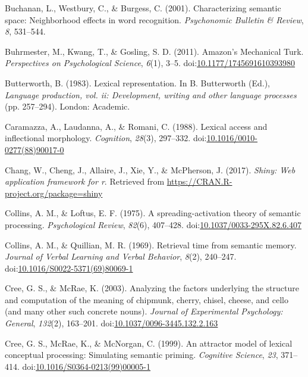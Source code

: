 \documentclass[english,,man]{apa6}
\theoremstyle{definition}
\theoremstyle{definition}
\theoremstyle{definition}
\theoremstyle{remark}
\begin{document}
\hypertarget{ref-Buchanan2001}{}
Buchanan, L., Westbury, C., \& Burgess, C. (2001). Characterizing
semantic space: Neighborhood effects in word recognition.
\emph{Psychonomic Bulletin \& Review}, \emph{8}, 531--544.

\hypertarget{ref-Buhrmester2011}{}
Buhrmester, M., Kwang, T., \& Gosling, S. D. (2011). Amazon's Mechanical
Turk. \emph{Perspectives on Psychological Science}, \emph{6}(1), 3--5.
doi:\href{https://doi.org/10.1177/1745691610393980}{10.1177/1745691610393980}

\hypertarget{ref-Butterworth1983}{}
Butterworth, B. (1983). Lexical representation. In B. Butterworth (Ed.),
\emph{Language production, vol. ii: Development, writing and other
language processes} (pp. 257--294). London: Academic.

\hypertarget{ref-Caramazza1988}{}
Caramazza, A., Laudanna, A., \& Romani, C. (1988). Lexical access and
inflectional morphology. \emph{Cognition}, \emph{28}(3), 297--332.
doi:\href{https://doi.org/10.1016/0010-0277(88)90017-0}{10.1016/0010-0277(88)90017-0}

\hypertarget{ref-R-shiny}{}
Chang, W., Cheng, J., Allaire, J., Xie, Y., \& McPherson, J. (2017).
\emph{Shiny: Web application framework for r}. Retrieved from
\url{https://CRAN.R-project.org/package=shiny}

\hypertarget{ref-Collins1975}{}
Collins, A. M., \& Loftus, E. F. (1975). A spreading-activation theory
of semantic processing. \emph{Psychological Review}, \emph{82}(6),
407--428.
doi:\href{https://doi.org/10.1037/0033-295X.82.6.407}{10.1037/0033-295X.82.6.407}

\hypertarget{ref-Collins1969}{}
Collins, A. M., \& Quillian, M. R. (1969). Retrieval time from semantic
memory. \emph{Journal of Verbal Learning and Verbal Behavior},
\emph{8}(2), 240--247.
doi:\href{https://doi.org/10.1016/S0022-5371(69)80069-1}{10.1016/S0022-5371(69)80069-1}

\hypertarget{ref-Cree2003}{}
Cree, G. S., \& McRae, K. (2003). Analyzing the factors underlying the
structure and computation of the meaning of chipmunk, cherry, chisel,
cheese, and cello (and many other such concrete nouns). \emph{Journal of
Experimental Psychology: General}, \emph{132}(2), 163--201.
doi:\href{https://doi.org/10.1037/0096-3445.132.2.163}{10.1037/0096-3445.132.2.163}

\hypertarget{ref-Cree1999}{}
Cree, G. S., McRae, K., \& McNorgan, C. (1999). An attractor model of
lexical conceptual processing: Simulating semantic priming.
\emph{Cognitive Science}, \emph{23}, 371--414.
doi:\href{https://doi.org/10.1016/S0364-0213(99)00005-1}{10.1016/S0364-0213(99)00005-1}
\end{document}
